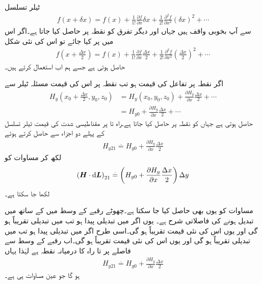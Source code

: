 ٹیلر تسلسل
\begin{align*}
f(x+\delta x)=f(x)+\frac{1}{1!}\frac{\partial f}{\partial x} \delta x + \frac{1}{2!}\frac{\partial^2 f}{\partial x^2} (\delta x)^2+\cdots
\end{align*}
سے آپ بخوبی واقف ہیں جہاں  اور دیگر تفرق کو نقطہ  پر حاصل کیا جاتا ہے۔اگر اس میں  پر کیا جائے تو اس کی نئی شکل
\begin{align*}
f(x+\tfrac{\Delta x}{2})=f(x)+\frac{1}{1!}\frac{\partial f}{\partial x} \frac{\Delta x}{2} + \frac{1}{2!}\frac{\partial^2 f}{\partial x^2} \left(\frac{\Delta x}{2}\right)^2+\cdots
\end{align*}
حاصل ہوتی ہے جسے ہم اب استعمال کرتے ہیں۔


اگر نقطہ  پر تفاعل  کی قیمت  ہو تب نقطہ  پر اس کی قیمت مسئلہ ٹیلر سے 
\begin{align*}
H_y(x_0+\tfrac{\Delta x}{2},y_0,z_0)&=H_y(x_0,y_0,z_0)+\frac{\partial H_y}{\partial x} \frac{\Delta x}{2}+\cdots\\
&=H_{y0}+\frac{\partial H_y}{\partial x} \frac{\Delta x}{2}+\cdots
\end{align*}
حاصل ہوتی ہے جہاں  کو نقطہ  پر حاصل کیا جاتا ہے۔راہ  تا  پر مقناطیسی شدت کی قیمت ٹیلر تسلسل کے پہلے دو اجزاء سے حاصل کرتے ہوئے
\begin{align}\label{مساوات_مقناطیسی_راہ_پہلے_حصے_پر_شدت}
H_{y21} \overset{.}{=}H_{y0}+\frac{\partial H_y}{\partial x} \frac{\Delta x}{2}
\end{align}
لکھ کر مساوات  کو
\begin{align}\label{مساوات_مقناطیسی_پہلے_حصہ_تکمل_الف}
\left( \kvec{H} \cdot \dif \kvec{L}\right)_{21}\overset{.}{=}\left(H_{y0}+\frac{\partial H_y}{\partial x} \frac{\Delta x}{2} \right)\Delta y 
\end{align}
لکھا جا سکتا ہے۔

مساوات  کو یوں بھی حاصل کیا جا سکتا ہے۔چھوٹے رقبے کے وسط میں  کے ساتھ  میں تبدیل ہونے کی فاصلاتی  شرح  ہے۔ یوں اگر  میں  تبدیلی پیدا ہو تب   میں تبدیلی تقریباً 
  ہو گی اور یوں اس کی نئی قیمت تقریباً  ہو گی۔اسی طرح اگر  میں  تبدیلی پیدا ہو تب   میں تبدیلی تقریباً  ہو گی اور یوں اس کی نئی قیمت تقریباً  ہو گی۔اب رقبے کے وسط سے   فاصلے پر   تا  راہ کا درمیانہ نقطہ ہے لہٰذا یہاں
\begin{align}\label{مساوات_مقناطیسی_راہ_پہلے_حصے_پر_شدت_دوبارہ}
H_{y21}\overset{.}{=}H_{y0}+\frac{\partial H_y}{\partial x}\frac{\Delta x}{2}
\end{align}
ہو گا جو عین مساوات  ہی  ہے۔

